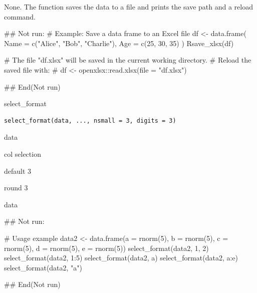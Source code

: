 \documentclass[a4paper]{book}
\begin{document}
%
\begin{Value}
None. The function saves the data to a file and prints the save path and a reload command.
\end{Value}
%
\begin{Examples}
\begin{ExampleCode}
\#\# Not run: 
# Example: Save a data frame to an Excel file
df <- data.frame(
  Name = c("Alice", "Bob", "Charlie"),
  Age = c(25, 30, 35)
)
Rsave_xlsx(df)

# The file "df.xlsx" will be saved in the current working directory.
# Reload the saved file with:
# df <- openxlsx::read.xlsx(file = "df.xlsx")

## End(Not run)
\end{ExampleCode}
\end{Examples}
%
\begin{Description}
select\_format
\end{Description}
%
\begin{Usage}
\begin{verbatim}
select_format(data, ..., nsmall = 3, digits = 3)
\end{verbatim}
\end{Usage}
%
\begin{Arguments}
\begin{ldescription}
\item[\code{data}] data

\item[\code{...}] col selection

\item[\code{nsmall}] default 3

\item[\code{digits}] round 3
\end{ldescription}
\end{Arguments}
%
\begin{Value}
data
\end{Value}
%
\begin{Examples}
\begin{ExampleCode}


\#\# Not run: 


# Usage example
data2 <- data.frame(a = rnorm(5), b = rnorm(5), c = rnorm(5), d = rnorm(5), e = rnorm(5))
select_format(data2, 1, 2)
select_format(data2, 1:5)
select_format(data2, a)
select_format(data2, a:e)
select_format(data2, "a")

## End(Not run)
\end{ExampleCode}
\end{Examples}
\end{document}
